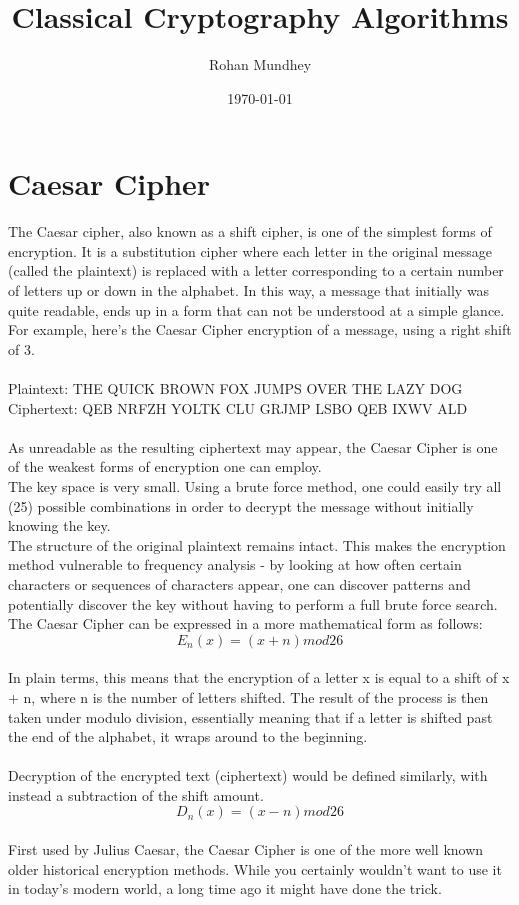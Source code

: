 \documentclass[11pt]{article}
\begin{document}
\title{Classical Cryptography Algorithms}
\author{Rohan Mundhey}
\date{\today}



\section{Caesar Cipher}
The Caesar cipher, also known as a shift cipher, is one of the simplest forms of encryption. It is a substitution cipher where each letter in the original message (called the plaintext) is replaced with a letter corresponding to a certain number of letters up or down in the alphabet.
In this way, a message that initially was quite readable, ends up in a form that can not be understood at a simple glance.
For example, here's the Caesar Cipher encryption of a message, using a right shift of 3.
\\
\\
Plaintext:  
THE QUICK BROWN FOX JUMPS OVER THE LAZY DOG
Ciphertext: 
QEB NRFZH YOLTK CLU GRJMP LSBO QEB IXWV ALD
\\
\\
As unreadable as the resulting ciphertext may appear, the Caesar Cipher is one of the weakest forms of encryption one can employ.
\\
The key space is very small. Using a brute force method, one could easily try all (25) possible combinations in order to decrypt the message without initially knowing the key.
\\
The structure of the original plaintext remains intact. This makes the encryption method vulnerable to frequency analysis - by looking at how often certain characters or sequences of characters appear, one can discover patterns and potentially discover the key without having to perform a full brute force search.
\\
The Caesar Cipher can be expressed in a more mathematical form as follows:
$$E_n(x)=(x+n)mod26$$
\\
In plain terms, this means that the encryption of a letter x is equal to a shift of x + n, where n is the number of letters shifted. The result of the process is then taken under modulo division, essentially meaning that if a letter is shifted past the end of the alphabet, it wraps around to the beginning.
\\
\\
Decryption of the encrypted text (ciphertext) would be defined similarly, with instead a subtraction of the shift amount.
\\
$$D_n(x)=(x-n)mod26$$
\\
First used by Julius Caesar, the Caesar Cipher is one of the more well known older historical encryption methods. While you certainly wouldn't want to use it in today's modern world, a long time ago it might have done the trick.
\\
\\
\end{document}
